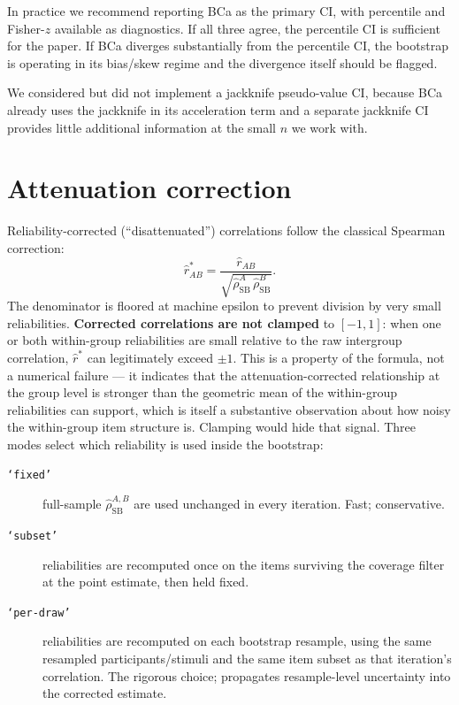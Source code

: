 \documentclass[11pt]{article}
\begin{document}
In practice we recommend reporting BCa as the primary CI, with percentile and Fisher-$z$ available as diagnostics. If all three agree, the percentile CI is sufficient for the paper. If BCa diverges substantially from the percentile CI, the bootstrap is operating in its bias/skew regime and the divergence itself should be flagged.

We considered but did not implement a jackknife pseudo-value CI, because BCa already uses the jackknife in its acceleration term and a separate jackknife CI provides little additional information at the small $n$ we work with.

\section{Attenuation correction}
\label{sec:atten}
Reliability-corrected (``disattenuated'') correlations follow the classical Spearman correction:
\begin{equation}
\hat r^{*}_{AB} = \frac{\hat r_{AB}}{\sqrt{\hat\rho_{\mathrm{SB}}^{A}\,\hat\rho_{\mathrm{SB}}^{B}}}.
\label{eq:atten}
\end{equation}
The denominator is floored at machine epsilon to prevent division by very small reliabilities. \textbf{Corrected correlations are not clamped} to $[-1,1]$: when one or both within-group reliabilities are small relative to the raw intergroup correlation, $\hat r^*$ can legitimately exceed $\pm 1$. This is a property of the formula, not a numerical failure --- it indicates that the attenuation-corrected relationship at the group level is stronger than the geometric mean of the within-group reliabilities can support, which is itself a substantive observation about how noisy the within-group item structure is. Clamping would hide that signal. Three modes select which reliability is used inside the bootstrap:
\begin{description}
\item[\texttt{`fixed'}] full-sample $\hat\rho_{\mathrm{SB}}^{A,B}$ are used unchanged in every iteration. Fast; conservative.
\item[\texttt{`subset'}] reliabilities are recomputed once on the items surviving the coverage filter at the point estimate, then held fixed.
\item[\texttt{`per-draw'}] reliabilities are recomputed on each bootstrap resample, using the same resampled participants/stimuli and the same item subset as that iteration's correlation. The rigorous choice; propagates resample-level uncertainty into the corrected estimate.
\end{description}
\end{document}
